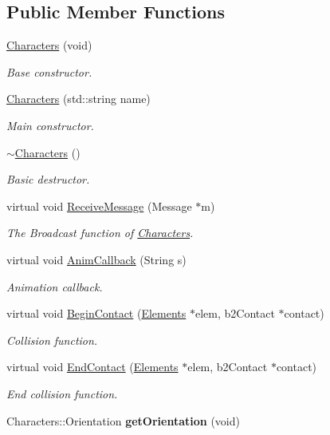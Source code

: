 \subsection*{Public Member Functions}
\begin{DoxyCompactItemize}
\item 
\hyperlink{class_characters_a3b7d631de563c07caaa918e217a97436}{Characters} (void)
\begin{DoxyCompactList}\small\item\em Base constructor. \end{DoxyCompactList}\item 
\hyperlink{class_characters_a3ebbe5ca8cc3965b55283af002ce8707}{Characters} (std\+::string name)
\begin{DoxyCompactList}\small\item\em Main constructor. \end{DoxyCompactList}\item 
\hypertarget{class_characters_a4aea85daea3f08b8b933e82cd42b3109}{\hyperlink{class_characters_a4aea85daea3f08b8b933e82cd42b3109}{$\sim$\+Characters} ()}\label{class_characters_a4aea85daea3f08b8b933e82cd42b3109}

\begin{DoxyCompactList}\small\item\em Basic destructor. \end{DoxyCompactList}\item 
virtual void \hyperlink{class_characters_ae6b55c4269efc485d7926f62544eef4e}{Receive\+Message} (Message $\ast$m)
\begin{DoxyCompactList}\small\item\em The Broadcast function of \hyperlink{class_characters}{Characters}. \end{DoxyCompactList}\item 
virtual void \hyperlink{class_characters_a6354b7fd409cde57312c5eca1cf43275}{Anim\+Callback} (String s)
\begin{DoxyCompactList}\small\item\em Animation callback. \end{DoxyCompactList}\item 
virtual void \hyperlink{class_characters_ae1b52f35e60cd23ec118595a9a8e8760}{Begin\+Contact} (\hyperlink{class_elements}{Elements} $\ast$elem, b2\+Contact $\ast$contact)
\begin{DoxyCompactList}\small\item\em Collision function. \end{DoxyCompactList}\item 
virtual void \hyperlink{class_characters_a87c76bb34f5c11e2da4537be07d2f846}{End\+Contact} (\hyperlink{class_elements}{Elements} $\ast$elem, b2\+Contact $\ast$contact)
\begin{DoxyCompactList}\small\item\em End collision function. \end{DoxyCompactList}\item 
\hypertarget{class_characters_a9be6daa0dc468da9c4c0ffa0d0d36ae1}{Characters\+::\+Orientation {\bfseries get\+Orientation} (void)}\label{class_characters_a9be6daa0dc468da9c4c0ffa0d0d36ae1}


\end{DoxyCompactItemize}

